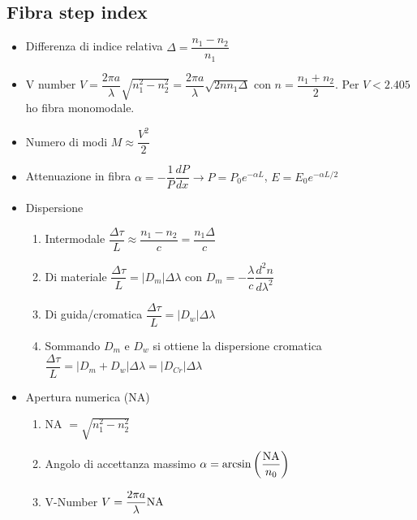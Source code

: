 \documentclass{article}
\begin{document}
\subsection{Fibra step index}
\begin{itemize}
  \item Differenza di indice relativa \(  \Delta = \dfrac{n_1 - n_2}{n_1} \)
  \item V number \(  V = \dfrac{2 \pi a}{\lambda} \sqrt{n_1^2 - n_2^2} = \dfrac{2 \pi a}{\lambda} \sqrt{2 n n_1 \Delta}\) con \(  n = \dfrac{n_1 + n_2}{2} \). Per \( V < 2.405 \) ho fibra monomodale.
  \item Numero di modi \(  M \approx \dfrac{V^2}{2} \)
  \item Attenuazione in fibra \(  \alpha = - \dfrac{1}{P} \dfrac{dP}{dx} \rightarrow P = P_0 e^{-\alpha L}\), \(   E = E_0 e^{-\alpha L / 2} \)
  \item Dispersione
        \begin{enumerate}
          \item Intermodale \(  \dfrac{\Delta \tau}{L} \approx \dfrac{n_1 - n_2}{c} = \dfrac{n_1 \Delta}{c} \)
          \item Di materiale \(  \dfrac{\Delta \tau}{L} = | D_m | \Delta \lambda \) con \( D_m = -\dfrac{\lambda}{c} \dfrac{d^2 n}{d \lambda^2} \)
          \item Di guida/cromatica \(  \dfrac{\Delta \tau}{L} = | D_w | \Delta \lambda \)
          \item Sommando \( D_m \) e \( D_w \) si ottiene la dispersione cromatica \( \dfrac{\Delta \tau}{L} = | D_m + D_w | \Delta \lambda = | D_{Cr} | \Delta \lambda \)
        \end{enumerate}
  \item Apertura numerica (NA)
        \begin{enumerate}
          \item NA \( \displaystyle = \sqrt{n_1^2 - n_2^2} \)
          \item Angolo di accettanza massimo \( \alpha = \arcsin \left( \dfrac{\textnormal{NA}}{n_0} \right) \)
          \item V-Number \( V = \dfrac{2 \pi a}{\lambda} \textnormal{NA} \)
        \end{enumerate}
\end{itemize}
\end{document}
